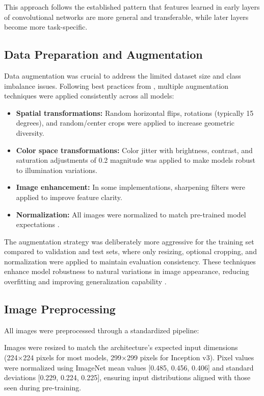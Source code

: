 \documentclass[a4paper,12pt]{report}
\begin{document}
This approach follows the established pattern that features learned in early layers of convolutional networks are more general and transferable, while later layers become more task-specific.

\subsection{Data Preparation and Augmentation}

Data augmentation was crucial to address the limited dataset size and class imbalance issues. Following best practices from \citep{perez2017effectivenessdataaugmentationimage}, multiple augmentation techniques were applied consistently across all models:

\begin{itemize}
    \item \textbf{Spatial transformations:} Random horizontal flips, rotations (typically 15 degrees), and random/center crops were applied to increase geometric diversity.
    \item \textbf{Color space transformations:} Color jitter with brightness, contrast, and saturation adjustments of 0.2 magnitude was applied to make models robust to illumination variations.
    \item \textbf{Image enhancement:} In some implementations, sharpening filters were applied to improve feature clarity.
    \item \textbf{Normalization:} All images were normalized to match pre-trained model expectations \citep{wu2018groupnormalization}.
\end{itemize}

The augmentation strategy was deliberately more aggressive for the training set compared to validation and test sets, where only resizing, optional cropping, and normalization were applied to maintain evaluation consistency. These techniques enhance model robustness to natural variations in image appearance, reducing overfitting and improving generalization capability \citep{perez2017effectivenessdataaugmentationimage}.

\subsection{Image Preprocessing}

All images were preprocessed through a standardized pipeline:

Images were resized to match the architecture's expected input dimensions (224×224 pixels for most models, 299×299 pixels for Inception v3). Pixel values were normalized using ImageNet mean values [0.485, 0.456, 0.406] and standard deviations [0.229, 0.224, 0.225], ensuring input distributions aligned with those seen during pre-training.
\end{document}
